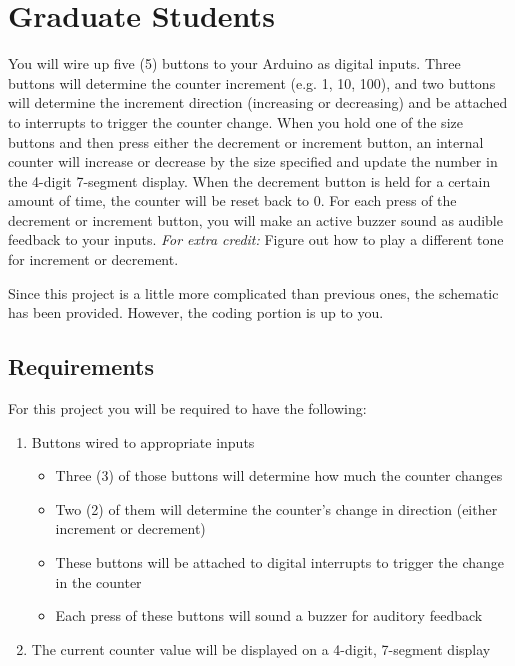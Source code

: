 \section*{Graduate Students} 
You will wire up five (5) buttons to your Arduino as digital inputs.
Three buttons will determine the counter increment (e.g. 1, 10, 100), and two buttons will determine the increment direction (increasing or decreasing) and be attached to interrupts to trigger the counter change.
When you hold one of the size buttons and then press either the decrement or increment button, an internal counter will increase or decrease by the size specified and update the number in the 4-digit 7-segment display.
When the decrement button is held for a certain amount of time, the counter will be reset back to 0.
For each press of the decrement or increment button, you will make an active buzzer sound as audible feedback to your inputs. \emph{For extra credit:} Figure out how to play a different tone for increment or decrement.

Since this project is a little more complicated than previous ones, the schematic has been provided. However, the coding portion is up to you.

    \subsection*{Requirements}
    For this project you will be required to have the following:
    \begin{enumerate}
        \item Buttons wired to appropriate inputs
            \begin{itemize}
                \item Three (3) of those buttons will determine how much the counter changes
                \item Two (2) of them will determine the counter's change in direction (either increment or decrement)
                \item These buttons will be attached to digital interrupts to trigger the change in the counter
                \item Each press of these buttons will sound a buzzer for auditory feedback
            \end{itemize}
        \item The current counter value will be displayed on a 4-digit, 7-segment display
    \end{enumerate}

